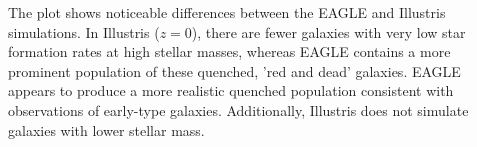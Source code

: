 \documentclass[10pt]{article}
\begin{document}
The plot shows noticeable differences between the EAGLE and Illustris simulations. In Illustris (\( z = 0 \)), there are fewer galaxies with very low star formation rates at high stellar masses, whereas EAGLE contains a more prominent population of these quenched, 'red and dead' galaxies. EAGLE appears to produce a more realistic quenched population consistent with observations of early-type galaxies. Additionally, Illustris does not simulate galaxies with lower stellar mass. 
\end{document}
